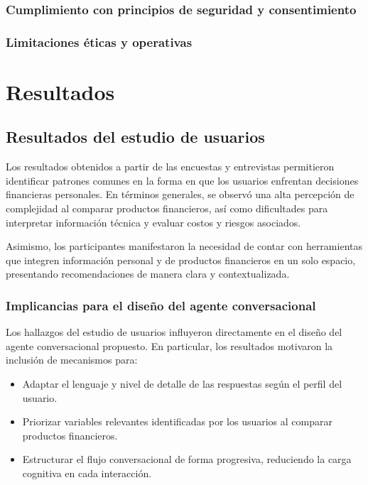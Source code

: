 \documentclass[
	spanish, %
	letterpaper, oneside
]{book}
\begin{document}
\begin{itemize}
\subsection{Cumplimiento con principios de seguridad y consentimiento}
\subsection{Limitaciones éticas y operativas}


\chapter{Resultados}


\section{Resultados del estudio de usuarios}

Los resultados obtenidos a partir de las encuestas y entrevistas permitieron identificar patrones comunes en la forma en que los usuarios enfrentan decisiones financieras personales. En términos generales, se observó una alta percepción de complejidad al comparar productos financieros, así como dificultades para interpretar información técnica y evaluar costos y riesgos asociados.

Asimismo, los participantes manifestaron la necesidad de contar con herramientas que integren información personal y de productos financieros en un solo espacio, presentando recomendaciones de manera clara y contextualizada.

\subsection{Implicancias para el diseño del agente conversacional}

Los hallazgos del estudio de usuarios influyeron directamente en el diseño del agente conversacional propuesto. En particular, los resultados motivaron la inclusión de mecanismos para:

\begin{itemize}
    \item Adaptar el lenguaje y nivel de detalle de las respuestas según el perfil del usuario.
    \item Priorizar variables relevantes identificadas por los usuarios al comparar productos financieros.
    \item Estructurar el flujo conversacional de forma progresiva, reduciendo la carga cognitiva en cada interacción.
\end{itemize}


\end{itemize}
\end{document}

